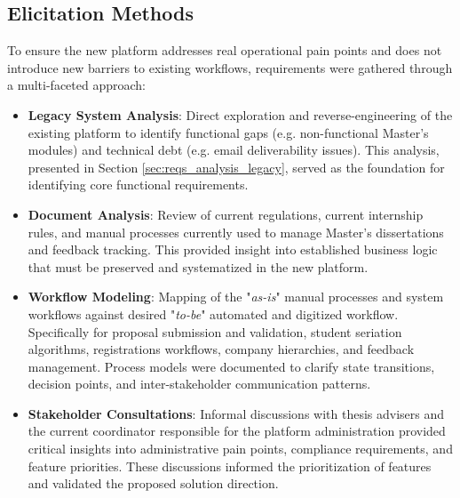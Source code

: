     \subsection{Elicitation Methods}
        {
            To ensure the new platform addresses real operational pain points and does not introduce new barriers to existing workflows, 
            requirements were gathered through a multi-faceted approach:
        }
        \begin{itemize}
                \item {
                    \textbf{Legacy System Analysis}: Direct exploration and reverse-engineering of the existing platform to identify functional gaps (e.g. non-functional Master's modules) and technical debt (e.g. email deliverability issues).
                    This analysis, presented in Section \ref{sec:reqs_analysis_legacy}, served as the foundation for identifying core functional requirements.
                }
                \item {
                    \textbf{Document Analysis}: Review of current regulations, current internship rules, and manual processes currently used to manage Master's dissertations and feedback tracking. 
                    This provided insight into established business logic that must be preserved and systematized in the new platform.
                }
                \item {
                    \textbf{Workflow Modeling}: Mapping of the "\textit{as-is}" manual processes and system workflows against desired "\textit{to-be}" automated and digitized workflow.
                    Specifically for proposal submission and validation, student seriation algorithms, registrations workflows, company hierarchies, and feedback management.
                    Process models were documented to clarify state transitions, decision points, and inter-stakeholder communication patterns.
                }
                \item {
                    \textbf{Stakeholder Consultations}: Informal discussions with thesis advisers and the current coordinator responsible for the platform administration provided critical insights into administrative pain points,
                    compliance requirements, and feature priorities.
                    These discussions informed the prioritization of features and validated the proposed solution direction.
                }
        \end{itemize}

